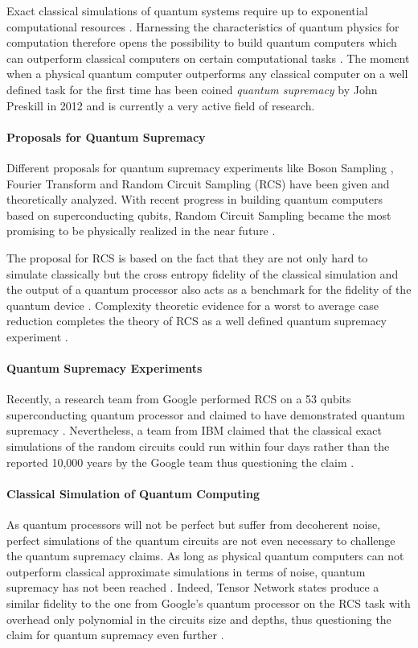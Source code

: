 Exact classical simulations of quantum systems require up to exponential computational resources \cite{feynman1999simulating}.
Harnessing the characteristics of quantum physics for computation therefore opens the possibility to build quantum computers which can outperform classical computers on 
certain computational tasks \cite{shor1999polynomial}. The moment when a physical quantum computer outperforms any classical computer on a well defined task
for the first time has been coined \textit{quantum supremacy} by John
Preskill in 2012 and is currently a very active field of research.

\paragraph{Proposals for Quantum Supremacy}
Different proposals for quantum supremacy experiments like Boson Sampling \cite{aaronson2010computational}, Fourier Transform \cite{fefferman2015power} and Random Circuit Sampling (RCS) \cite{boixo2018characterizing} have
been given and theoretically analyzed. With recent progress in building quantum computers based on 
superconducting qubits, Random Circuit Sampling became the most promising to be physically realized in the near future \cite{boul2018quantum}.

The proposal for RCS is based on the fact that they are not only hard 
to simulate classically but the cross entropy fidelity of the classical simulation and the output of a 
quantum processor also acts as a benchmark for the fidelity of the quantum device \cite{boixo2018characterizing}. Complexity theoretic 
evidence for a worst to average case reduction completes the theory of 
RCS as a well defined quantum supremacy experiment \cite{boul2018quantum}.

\paragraph{Quantum Supremacy Experiments}
Recently, a research team from Google performed RCS on a 53 qubits superconducting 
quantum processor and claimed to have demonstrated quantum supremacy \cite{google2019supremacy}. Nevertheless, a team from IBM 
claimed that the classical exact simulations of the random circuits could run within four days
rather than the reported 10,000 years by the Google team thus questioning the claim \cite{pednault2019leveraging}.

\paragraph{Classical Simulation of Quantum Computing}
As quantum processors will not be perfect but suffer from decoherent noise, perfect simulations 
of the quantum circuits are not even necessary to challenge the quantum supremacy claims. 
As long as physical quantum computers can not outperform classical approximate simulations in 
terms of noise, quantum supremacy has not been reached \cite{boixo2018characterizing}.
Indeed, Tensor Network states produce a similar fidelity to the one from Google's quantum processor on the RCS task 
with overhead only polynomial in the circuits size and depths, thus questioning the claim for quantum supremacy even further \cite{fefferman2015power}.

